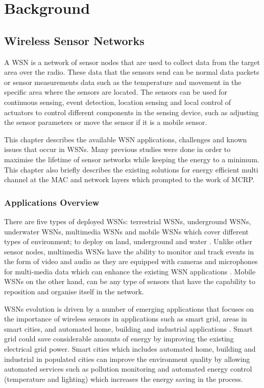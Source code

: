\chapter{Background}
\label{literatureReview}

\section{Wireless Sensor Networks}
A WSN is a network of sensor nodes that are used to collect data from the target area over the radio. These data that the sensors send can be normal data packets or sensor measurements data such as the temperature and movement in the specific area where the sensors are located. The sensors can be used for continuous sensing, event detection, location sensing and local control of actuators to control different components in the sensing device, such as adjusting the sensor parameters or move the sensor if it is a mobile sensor.

This chapter describes the available WSN applications, challenges and known issues that occur in WSNs. Many previous studies were done in order to maximise the lifetime of sensor networks while keeping the energy to a minimum. This chapter also briefly describes the existing solutions for energy efficient multi channel at the MAC and network layers which prompted to the work of MCRP. 

\subsection{Applications Overview}
There are five types of deployed WSNs: terrestrial WSNs, underground WSNs, underwater WSNs, multimedia WSNs and mobile WSNs which cover different types of environment; to deploy on land, underground and water \cite{wsnSurvey1}. Unlike other sensor nodes, multimedia WSNs have the ability to monitor and track events in the form of video and audio as they are equipped with cameras and microphones for multi-media data which can enhance the existing WSN applications \cite{wsnSurvey3}. Mobile WSNs on the other hand, can be any type of sensors that have the capability to reposition and organise itself in the network.

WSNs evolution is driven by a number of emerging applications that focuses on the importance of wireless sensors in applications such as smart grid, areas in smart cities, and automated home, building and industrial applications \cite{beyondInteroperability}. Smart grid could save considerable amounts of energy by improving the existing electrical grid power. Smart cities which includes automated home, building and industrial in populated cities can improve the environment quality by allowing automated services such as pollution monitoring and automated energy control (temperature and lighting) which increases the energy saving in the process. 

